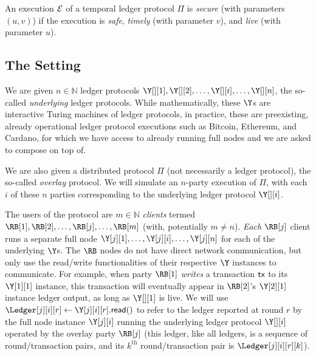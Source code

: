 \begin{definition}
  An execution $\mathcal{E}$ of a temporal ledger protocol $\Pi$ is \emph{secure} (with parameters $(u, v)$) if the execution
  is \emph{safe}, \emph{timely} (with parameter $v$), and \emph{live} (with parameter $u$).
\end{definition}

\subsection{The Setting}

We are given $n \in \mathbb{N}$ ledger protocols
$\Y[][1], \Y[][2], \ldots, \Y[][i], \ldots, \Y[][n]$,
the so-called \emph{underlying} ledger protocols.
While mathematically, these $\Y$s are interactive Turing machines of ledger protocols,
in practice, these are preexisting, already operational ledger protocol executions
such as Bitcoin, Ethereum, and Cardano, for which we have access to already running full nodes
and we are asked to compose on top of.

We are also given a distributed protocol $\Pi$ (not necessarily a ledger protocol),
the so-called \emph{overlay} protocol. We will simulate an $n$-party execution of $\Pi$,
with each $i$ of these $n$ parties corresponding to the underlying ledger protocol $\Y[][i]$.

The users of the protocol are $m \in \mathbb{N}$ \rollerblade \emph{clients} termed
$\RB[1], \RB[2], \ldots, \RB[j], \ldots, \RB[m]$ (with, potentially $m \neq n$).
\emph{Each} $\RB[j]$ client runs a separate full node $\Y[j][1], \ldots, \Y[j][i], \ldots, \Y[j][n]$
for each of the underlying $\Y$s. The $\RB$ nodes do not have direct network communication, but only
use the read/write functionalities of their respective $\Y$ instances to communicate.
For example, when party $\RB[1]$ \emph{writes} a transaction $\textsf{tx}$ to its $\Y[1][1]$ instance,
this transaction will eventually appear in $\RB[2]$'s $\Y[2][1]$ instance ledger output,
as long as $\Y[][1]$ is live.
We will use $\Ledger[j][i][r] \gets \Y[j][i][r].\lread()$ to refer to the ledger reported at
round $r$ by the full node instance $\Y[j][i]$ running the underlying ledger protocol $\Y[][i]$
operated by the overlay party $\RB[j]$
(this ledger, like all ledgers, is a sequence of round/transaction pairs, and its
$k^\text{th}$ round/transaction pair is $\Ledger[j][i][r][k]$).


